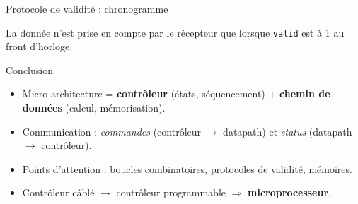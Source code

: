 \begin{frame}{Protocole de validit\'e : chronogramme}
  \centering

  \vspace{2mm}
  La donn\'ee n'est prise en compte par le r\'ecepteur que lorsque \texttt{valid} est \`a 1 au front d'horloge.
\end{frame}

\begin{frame}{Conclusion}
  \begin{itemize}
    \item Micro-architecture = \textbf{contr\^oleur} (\'etats, s\'equencement) + \textbf{chemin de donn\'ees} (calcul, m\'emorisation).
    \item Communication : \emph{commandes} (contr\^oleur $\to$ datapath) et \emph{status} (datapath $\to$ contr\^oleur).
    \item Points d'attention : boucles combinatoires, protocoles de validit\'e, m\'emoires.
    \item Contr\^oleur c\^abl\'e $\to$ contr\^oleur programmable $\Rightarrow$ \textbf{microprocesseur}.
  \end{itemize}
\end{frame}
